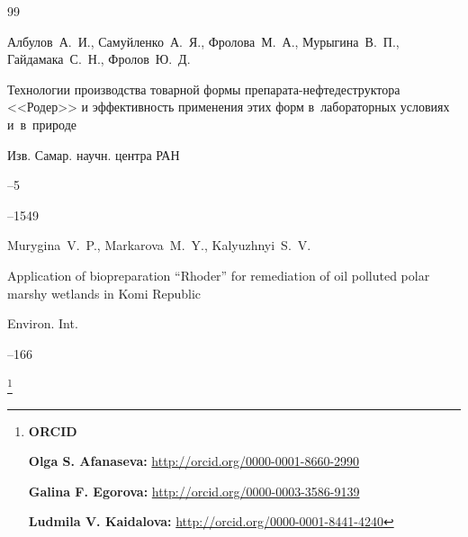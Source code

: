 \begin{thebibliography}{99}

\by Албулов~А.~И., Самуйленко~А.~Я., Фролова~М.~А., Мурыгина~В.~П., Гайдамака~С.~Н., Фролов~Ю.~Д.

\paper Технологии производства товарной формы препарата-нефтедеструктора <<Родер>> и эффективность применения этих форм в~лабораторных условиях и~в~природе

\jour Изв. Самар. научн. центра РАН



--5

--1549





\by Murygina~V.~P., Markarova~M.~Y., Kalyuzhnyi~S.~V.

\paper Application of biopreparation ``Rhoder'' for remediation of oil polluted polar marshy wetlands in Komi Republic

\jour Environ. Int.




--166





\end{thebibliography}

\RuDate





\bigskip





\makeentitle





\thanks{{\bf ORCID}





{\bf Olga S. Afanaseva:} \url{http://orcid.org/0000-0001-8660-2990}



{\bf Galina F. Egorova:} \url{http://orcid.org/0000-0003-3586-9139}



{\bf Ludmila V. Kaidalova:} \url{http://orcid.org/0000-0001-8441-4240}







}





